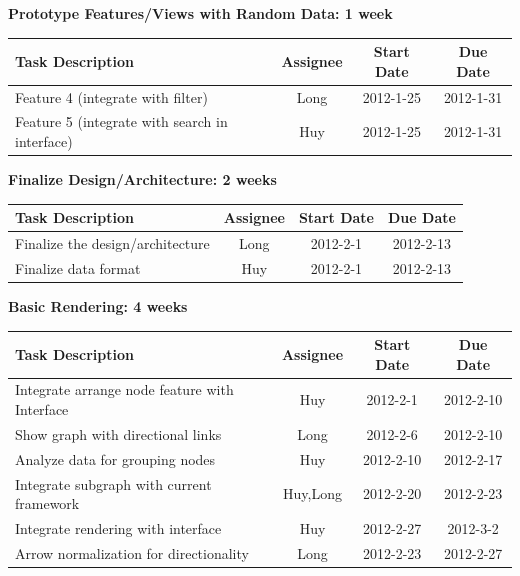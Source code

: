 \documentclass[12pt, letterpaper]{article}
\begin{document}
\begin{center}
		{\bf Prototype Features/Views with Random Data: 1 week}
    \begin{tabular}{| p{8.3cm} || c | c | c | }
      \hline
      Task Description & Assignee & Start Date & Due Date \\
      \hline
	    Feature 4 (integrate with filter)  & Long & 2012-1-25 & 2012-1-31 \\
            Feature 5 (integrate with search in interface) & Huy & 2012-1-25 & 2012-1-31 \\
      \hline
    \end{tabular}
  \end{center}

  \begin{center}
		{\bf Finalize Design/Architecture: 2 weeks}
    \begin{tabular}{|p{8.3cm} || c | c | c | }
      \hline
      Task Description & Assignee & Start Date & Due Date \\
      \hline
	    Finalize the design/architecture & Long & 2012-2-1 & 2012-2-13 \\
	    Finalize data format  & Huy & 2012-2-1 & 2012-2-13 \\
      \hline
    \end{tabular}
  \end{center}

  \begin{center}
		{\bf Basic Rendering: 4 weeks}
    \begin{tabular}{| p{8.3cm} || c | c | c | }
      \hline
      Task Description & Assignee & Start Date & Due Date \\
      \hline
	    Integrate arrange node feature with Interface & Huy & 2012-2-1 & 2012-2-10 \\
            Show graph with directional links & Long & 2012-2-6 &  2012-2-10 \\
            Analyze data for grouping nodes & Huy & 2012-2-10 & 2012-2-17 \\
            Integrate subgraph with current framework & Huy,Long & 2012-2-20 & 2012-2-23 \\
            Integrate rendering with interface  & Huy & 2012-2-27 & 2012-3-2 \\  
            Arrow normalization for directionality  & Long & 2012-2-23 & 2012-2-27 \\
      \hline
    \end{tabular}
  \end{center}
\end{document}
